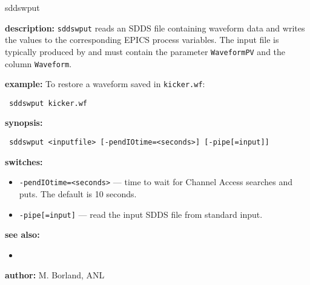 \begin{sddsprog}{sddswput}
\item {\bf description:}
  \verb+sddswput+ reads an SDDS file containing waveform data and writes the
  values to the corresponding EPICS process variables.  The input file is
  typically produced by  and must contain the parameter
  \verb|WaveformPV| and the column \verb|Waveform|.

\item {\bf example:}
  To restore a waveform saved in \verb|kicker.wf|:
  \begin{flushleft}{\tt
  sddswput kicker.wf
  }\end{flushleft}

\item {\bf synopsis:}
  \begin{flushleft}{\tt
  sddswput <inputfile>\
      [-pendIOtime=<seconds>] [-pipe[=input]]
  }\end{flushleft}

\item {\bf switches:}
  \begin{itemize}
  \item {\tt -pendIOtime=<seconds>} --- time to wait for Channel Access searches and puts. The default is 10 seconds.
  \item {\tt -pipe[=input]} --- read the input SDDS file from standard input.
  \end{itemize}

\item {\bf see also:}
  \begin{itemize}
  \item {}
  \end{itemize}

\item {\bf author:} M. Borland, ANL
\end{sddsprog}
